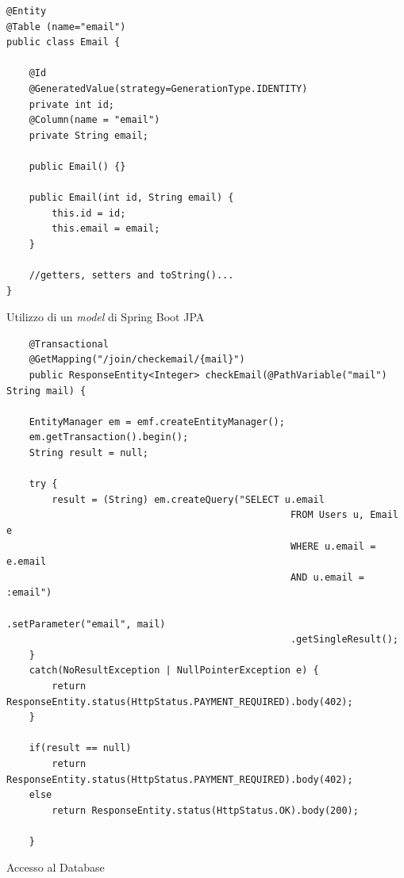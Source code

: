 \begin{algorithm}
\centering
\begin{verbatim}
@Entity
@Table (name="email")
public class Email {

	@Id
	@GeneratedValue(strategy=GenerationType.IDENTITY)
	private int id;
	@Column(name = "email")
	private String email;
	
	public Email() {}

	public Email(int id, String email) {
		this.id = id;
		this.email = email;
	}
	
	//getters, setters and toString()...
}
\end{verbatim}
\caption{Utilizzo di un \emph{model} di Spring Boot JPA}\label{alg:checkemailmodel}
\end{algorithm}

\begin{algorithm}
\centering
\begin{verbatim}
	@Transactional
	@GetMapping("/join/checkemail/{mail}")
	public ResponseEntity<Integer> checkEmail(@PathVariable("mail") String mail) {

	EntityManager em = emf.createEntityManager();
	em.getTransaction().begin();
	String result = null;

	try {
		result = (String) em.createQuery("SELECT u.email
                                                  FROM Users u, Email e
                                                  WHERE u.email = e.email 
                                                  AND u.email = :email")
                                                  .setParameter("email", mail)
                                                  .getSingleResult();
	}
	catch(NoResultException | NullPointerException e) {
		return ResponseEntity.status(HttpStatus.PAYMENT_REQUIRED).body(402);
	}

	if(result == null)
		return ResponseEntity.status(HttpStatus.PAYMENT_REQUIRED).body(402);
	else
		return ResponseEntity.status(HttpStatus.OK).body(200);

	}
\end{verbatim}
\caption{Accesso al Database}\label{alg:checkemail}
\end{algorithm}

